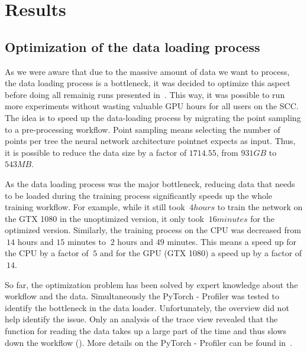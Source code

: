 \documentclass[12pt, a4paper, hidelinks]{article}
\begin{document}
\section{Results}
\label{sec:results}

\subsection{Optimization of the data loading process}
\label{sec:r-data-loading}

As we were aware that due to the massive amount of data we want to process, the data loading process is a bottleneck, it was decided to optimize this aspect before doing all remainig runs presented in~. This way, it was possible to run more experiments without wasting valuable \ac{GPU} hours for all users on the \ac{SCC}. The idea is to speed up the data-loading process by migrating the point sampling to a pre-processing workflow. Point sampling means selecting the number of points per tree the neural network architecture pointnet expects as input. Thus, it is possible to reduce the data size by a factor of $ 1714.55 $, from $931 GB $ to $543 MB $. 

As the data loading process was the major bottleneck, reducing data that needs to be loaded during the training process significantly speeds up the whole training workflow. For example, while it still took $~4 hours$ to train the network on the GTX 1080 in the unoptimized version, it only took $~16 minutes$ for the optimized version. Similarly, the training process on the \ac{CPU} was decreased from $~14$ hours and $15$ minutes to $~2$ hours and $49$ minutes. This means a speed up for the \ac{CPU} by a factor of $~5$ and for the \ac{GPU} (GTX 1080) a speed up by a factor of $~14$.

So far, the optimization problem has been solved by expert knowledge about the workflow and the data. Simultaneously the PyTorch - Profiler was tested to identify the bottleneck in the data loader. Unfortunately, the overview did not help identify the issue. Only an analysis of the trace view revealed that the function for reading the data takes up a large part of the time and thus slows down the workflow (). More details on the PyTorch - Profiler can be found in~.
\end{document}
